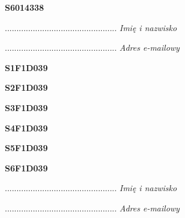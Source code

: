 \begin{turn}{90}\huge \textbf{S6014338}\end{turn}

\begin{turn}{90}\begin{minipage}{\linewidth} \vspace{20mm} ................................................  \textit{Imię i nazwisko}\end{minipage}\end{turn}

\begin{turn}{90}\begin{minipage}{\linewidth} \vspace{20mm} ................................................  \textit{Adres e-mailowy}\end{minipage}\end{turn}

\begin{turn}{90}\huge \textbf{S1F1D039}\end{turn}

\begin{turn}{90}\huge \textbf{S2F1D039}\end{turn}

\begin{turn}{90}\huge \textbf{S3F1D039}\end{turn}

\begin{turn}{90}\huge \textbf{S4F1D039}\end{turn}

\begin{turn}{90}\huge \textbf{S5F1D039}\end{turn}

\begin{turn}{90}\huge \textbf{S6F1D039}\end{turn}

\begin{turn}{90}\begin{minipage}{\linewidth} \vspace{20mm} ................................................  \textit{Imię i nazwisko}\end{minipage}\end{turn}

\begin{turn}{90}\begin{minipage}{\linewidth} \vspace{20mm} ................................................  \textit{Adres e-mailowy}\end{minipage}\end{turn}

